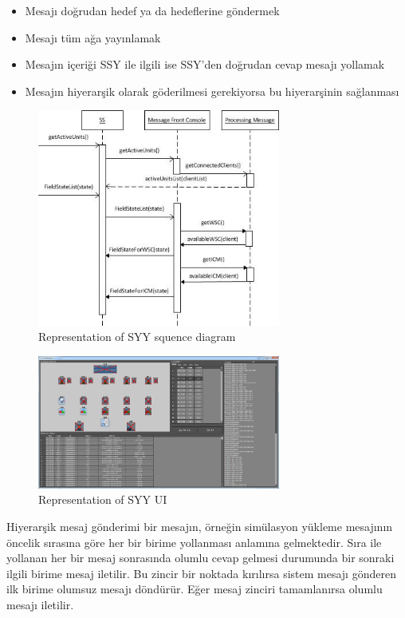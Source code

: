 \documentclass[conference]{IEEEtran}
\begin{document}
\begin{itemize}
\item Mesajı doğrudan hedef ya da hedeflerine göndermek
\item Mesajı tüm ağa yayınlamak
\item Mesajın içeriği SSY ile ilgili ise SSY’den doğrudan cevap mesajı yollamak
\item Mesajın hiyerarşik olarak göderilmesi gerekiyorsa bu hiyerarşinin sağlanması
\end{itemize}






\begin{figure}[h!]
  \centering
  \includegraphics[width=8cm]{syySequenceDiagram.jpg}
  \caption{Representation of SYY squence diagram}\label{fig:syySequenceDiagram}
\end{figure}


\begin{figure}[h!]
  \centering
  \includegraphics[width=8cm]{syygrafic.jpg}
  \caption{Representation of SYY UI}\label{fig:syygrafic}
\end{figure}




Hiyerarşik mesaj gönderimi bir mesajın, örneğin simülasyon yükleme mesajının öncelik sırasına göre her bir birime yollanması anlamına gelmektedir. Sıra ile yollanan her bir mesaj sonrasında olumlu cevap gelmesi durumunda bir sonraki ilgili birime mesaj iletilir. Bu zincir bir noktada kırılırsa sistem mesajı gönderen ilk birime olumsuz mesajı döndürür. Eğer mesaj zinciri tamamlanırsa olumlu mesajı iletilir.
\end{document}
